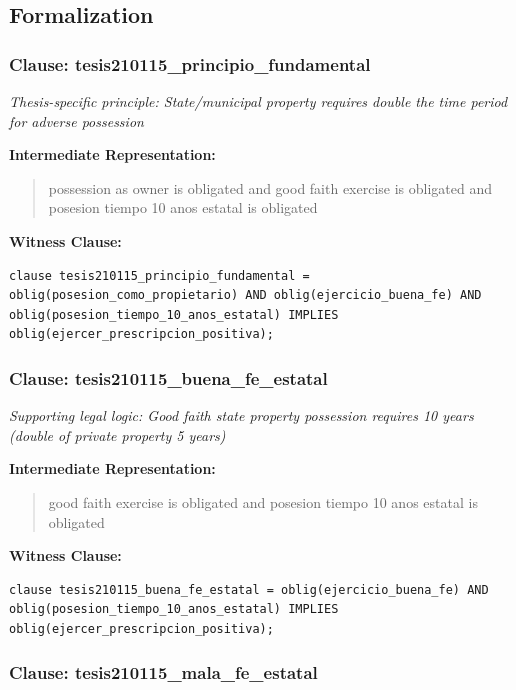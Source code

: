 \documentclass[11pt,a4paper]{article}
\begin{document}
\subsection{Formalization}

\subsubsection{Clause: tesis210115\_principio\_fundamental}

\textit{Thesis-specific principle: State/municipal property requires double the time period for adverse possession}

\textbf{Intermediate Representation:}

\begin{quote}
possession as owner is obligated and good faith exercise is obligated and posesion tiempo 10 anos estatal is obligated
\end{quote}

\textbf{Witness Clause:}

\begin{lstlisting}[style=witnessstyle, language=Witness]
clause tesis210115_principio_fundamental = oblig(posesion_como_propietario) AND oblig(ejercicio_buena_fe) AND oblig(posesion_tiempo_10_anos_estatal) IMPLIES oblig(ejercer_prescripcion_positiva);
\end{lstlisting}

\subsubsection{Clause: tesis210115\_buena\_fe\_estatal}

\textit{Supporting legal logic: Good faith state property possession requires 10 years (double of private property 5 years)}

\textbf{Intermediate Representation:}

\begin{quote}
good faith exercise is obligated and posesion tiempo 10 anos estatal is obligated
\end{quote}

\textbf{Witness Clause:}

\begin{lstlisting}[style=witnessstyle, language=Witness]
clause tesis210115_buena_fe_estatal = oblig(ejercicio_buena_fe) AND oblig(posesion_tiempo_10_anos_estatal) IMPLIES oblig(ejercer_prescripcion_positiva);
\end{lstlisting}

\subsubsection{Clause: tesis210115\_mala\_fe\_estatal}
\end{document}

